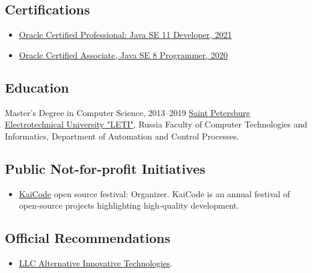 \documentclass{vl}
\begin{document}
    \subsection*{Certifications}

    \begin{itemize}
        \itemsep0em
        \item \href{https://catalog-education.oracle.com/pls/certview/sharebadge?id=87F6A2FE819A5A5AF4120A05900AB28A461EE9A3EE9FBFA02721FADAEB3BCE19}{Oracle Certified Professional: Java SE 11 Developer, 2021}
        \item \href{https://www.credly.com/badges/e2d9ddda-20dc-433d-8ab7-18548fd0fd8f/public_url}{Oracle Certified Associate, Java SE 8 Programmer, 2020}
    \end{itemize}

    \subsection*{Education}

    \begin{samepage}
        Master's Degree in Computer Science, 2013--2019\newline
        \href{https://etu.ru/en/university/}{Saint Petersburg Electrotechnical University "LETI"}, Russia\newline
        Faculty of Computer Technologies and Informatics, Department of Automation and Control Processes.
    \end{samepage}

    \subsection*{Public Not-for-profit Initiatives}
    \begin{itemize}
        \item \href{https://www.kaicode.org}{KaiCode} open source festival: Organizer.
        KaiCode is an annual festival of open-source projects highlighting high-quality development.
    \end{itemize}
    \subsection*{Official Recommendations}
    \begin{itemize}
        \item \href{https://github.com/volodya-lombrozo/volodya-lombrozo.github.io/blob/24eb2bbed8fac71c90ddef6ff4d93de8fb4f9f26/_cv/recommendations/letter_of_recommendation_ait.pdf}{LLC Alternative Innovative Technologies}.
    \end{itemize}
\end{document}
